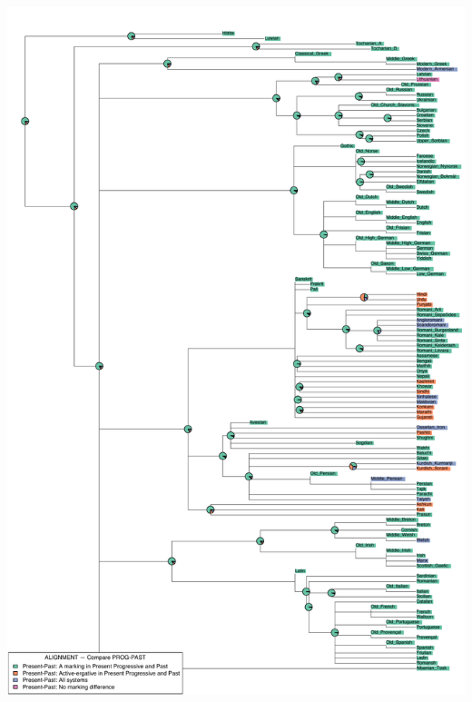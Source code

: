 \includegraphics[width=.9\linewidth]{supp-graphics/ALIGNMENTComparePROGPASTPAST-APROG-OALIGNMENTComparePROGPASTPROG-APST-OALIGNMENTComparePROGPASTPROG-SoPST-So.pdf}

